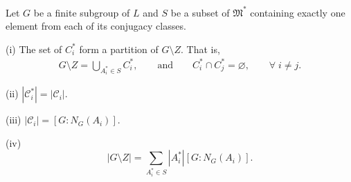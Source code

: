 \begin{theorem} \label{partitiontheorem} Let $G$ be a finite subgroup of $L$ and $S$ be a subset of $\mathfrak{M}^*$  containing exactly one element from each of its conjugacy classes. \vspace{2mm}

(i) The set of $C_i^*$ form a partition of $G \! \setminus \! Z$. That is,
\begin{align*} G \! \setminus \! Z = \bigcup\limits_{A_i^* \in S} C_i^*,  \qquad \text{and}  \qquad C_i^* \cap C_j^* = \varnothing, \qquad \forall \;  i \neq j.
\end{align*}

(ii) \: \! $|\mathcal{C}_i^*| = |\mathcal{C}_i|$. \vspace{4mm}

(iii) \: $|\mathcal{C}_i| = [G : N_G(A_i)]$. \vspace{4mm}

(iv) $$|G \! \setminus  \! Z| = \sum_{A_i^* \in S} |A_i^*| [G:N_G(A_i)].$$

\end{theorem}

